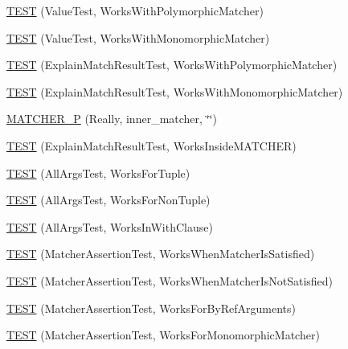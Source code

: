 \begin{DoxyCompactItemize}
\hyperlink{namespacetesting_1_1gmock__matchers__test_a150118d4e990ba9fb9978329e742c931}{T\+E\+ST} (Value\+Test, Works\+With\+Polymorphic\+Matcher)
\item 
\hyperlink{namespacetesting_1_1gmock__matchers__test_a53403682e9ffc12152b0b1c7f55dfa12}{T\+E\+ST} (Value\+Test, Works\+With\+Monomorphic\+Matcher)
\item 
\hyperlink{namespacetesting_1_1gmock__matchers__test_a985e2bc1546b67de764d759de111e8e9}{T\+E\+ST} (Explain\+Match\+Result\+Test, Works\+With\+Polymorphic\+Matcher)
\item 
\hyperlink{namespacetesting_1_1gmock__matchers__test_aeff2711a03b27a66c1c98ed97ff49b09}{T\+E\+ST} (Explain\+Match\+Result\+Test, Works\+With\+Monomorphic\+Matcher)
\item 
\hyperlink{namespacetesting_1_1gmock__matchers__test_ab4f04d3b75ca92e4f5fd711b9f2a514a}{M\+A\+T\+C\+H\+E\+R\+\_\+P} (Really, inner\+\_\+matcher, \char`\"{}\char`\"{})
\item 
\hyperlink{namespacetesting_1_1gmock__matchers__test_ae57edef8890da6b929dd0d21c2f7c071}{T\+E\+ST} (Explain\+Match\+Result\+Test, Works\+Inside\+M\+A\+T\+C\+H\+ER)
\item 
\hyperlink{namespacetesting_1_1gmock__matchers__test_aeea300647af4c7611f4e491cabcbf950}{T\+E\+ST} (All\+Args\+Test, Works\+For\+Tuple)
\item 
\hyperlink{namespacetesting_1_1gmock__matchers__test_aacc3ed6d6a0f9ff552019d0d58817b6f}{T\+E\+ST} (All\+Args\+Test, Works\+For\+Non\+Tuple)
\item 
\hyperlink{namespacetesting_1_1gmock__matchers__test_ad62534535946b2ef45457fb653f73a98}{T\+E\+ST} (All\+Args\+Test, Works\+In\+With\+Clause)
\item 
\hyperlink{namespacetesting_1_1gmock__matchers__test_ad37559f9112c04334a62ce9617cf1349}{T\+E\+ST} (Matcher\+Assertion\+Test, Works\+When\+Matcher\+Is\+Satisfied)
\item 
\hyperlink{namespacetesting_1_1gmock__matchers__test_a2f3755be7052d6e7769e3323053399d0}{T\+E\+ST} (Matcher\+Assertion\+Test, Works\+When\+Matcher\+Is\+Not\+Satisfied)
\item 
\hyperlink{namespacetesting_1_1gmock__matchers__test_afcf1287c7fd759157367026613ddd727}{T\+E\+ST} (Matcher\+Assertion\+Test, Works\+For\+By\+Ref\+Arguments)
\item 
\hyperlink{namespacetesting_1_1gmock__matchers__test_a0fe4bde05f667c4877e3b4a4a7bde002}{T\+E\+ST} (Matcher\+Assertion\+Test, Works\+For\+Monomorphic\+Matcher)
\item 

\end{DoxyCompactItemize}
